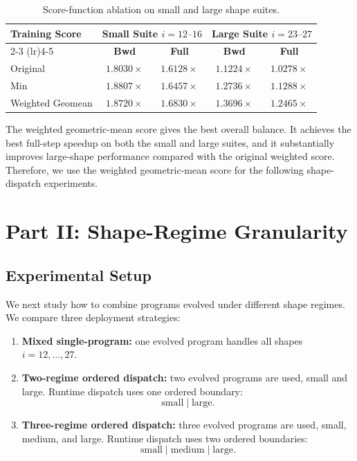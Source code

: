 \documentclass[11pt]{article}
\begin{document}
\begin{table}[t]
\centering
\small
\caption{Score-function ablation on small and large shape suites.}
\begin{tabular}{lcccc}
\toprule
\multirow{2}{*}{\textbf{Training Score}}
& \multicolumn{2}{c}{\textbf{Small Suite} \(i=12\text{--}16\)}
& \multicolumn{2}{c}{\textbf{Large Suite} \(i=23\text{--}27\)} \\
\cmidrule(lr){2-3} \cmidrule(lr){4-5}
& \textbf{Bwd}
& \textbf{Full}
& \textbf{Bwd}
& \textbf{Full} \\
\midrule
Original
& \(1.8030\times\)
& \(1.6128\times\)
& \(1.1224\times\)
& \(1.0278\times\) \\

Min
& \(1.8807\times\)
& \(1.6457\times\)
& \(1.2736\times\)
& \(1.1288\times\) \\

Weighted Geomean
& \(1.8720\times\)
& \(\mathbf{1.6830\times}\)
& \(\mathbf{1.3696\times}\)
& \(\mathbf{1.2465\times}\) \\
\bottomrule
\end{tabular}
\end{table}

\noindent
The weighted geometric-mean score gives the best overall balance. It achieves the best full-step speedup on both the small and large suites, and it substantially improves large-shape performance compared with the original weighted score. Therefore, we use the weighted geometric-mean score for the following shape-dispatch experiments.

\vspace{1em}

\section{Part II: Shape-Regime Granularity}

\subsection{Experimental Setup}

\noindent
We next study how to combine programs evolved under different shape regimes. We compare three deployment strategies:

\begin{enumerate}
    \item \textbf{Mixed single-program:} one evolved program handles all shapes \(i=12,\ldots,27\).

    \item \textbf{Two-regime ordered dispatch:} two evolved programs are used, small and large. Runtime dispatch uses one ordered boundary:
    \[
    \text{small} \;|\; \text{large}.
    \]

    \item \textbf{Three-regime ordered dispatch:} three evolved programs are used, small, medium, and large. Runtime dispatch uses two ordered boundaries:
    \[
    \text{small} \;|\; \text{medium} \;|\; \text{large}.
    \]
\end{enumerate}
\end{document}

